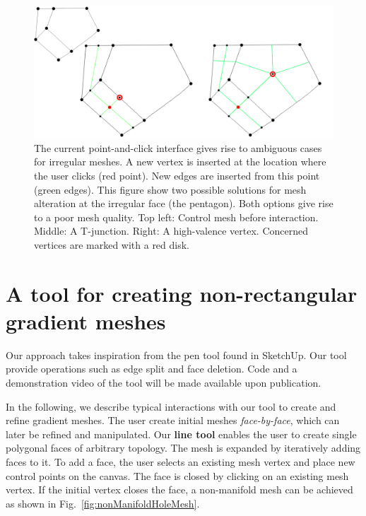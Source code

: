 \documentclass{egpubl}
\begin{document}
	
	\begin{figure}[t]
		\centering
		\includegraphics[scale=0.21]{pentagonWControlMesh.png}
		\caption{The current point-and-click interface gives rise to ambiguous cases for irregular meshes. A new vertex is inserted at the location where the user clicks (red point). New edges are inserted from this point (green edges). This figure show two possible solutions for mesh alteration at the irregular face (the pentagon). Both options give rise to a poor mesh quality. Top left: Control mesh before interaction. Middle: A T-junction. Right: A high-valence vertex. Concerned vertices are marked with a red disk.
		}
		\label{fig:adHocPentagon}
	\end{figure}
	
	\section{A tool for creating non-rectangular gradient meshes}
	\label{sec:method}
	
	Our approach takes inspiration from the pen tool found in SketchUp. Our tool provide operations such as edge split and face deletion. Code and a demonstration video of the tool will be made available upon publication.
	
	In the following, we describe typical interactions with our tool to create and refine gradient meshes. The user create initial meshes \textit{face-by-face}, which can later be refined and manipulated. Our \textbf{line tool} enables the user to create single polygonal faces of arbitrary topology. The mesh is expanded by iteratively adding faces to it. To add a face, the user selects an existing mesh vertex and place new control points on the canvas. The face is closed by clicking on an existing mesh vertex. If the initial vertex closes the face, a non-manifold mesh can be achieved as shown in Fig.~\ref{fig:nonManifoldHoleMesh}.
	
\end{document}
